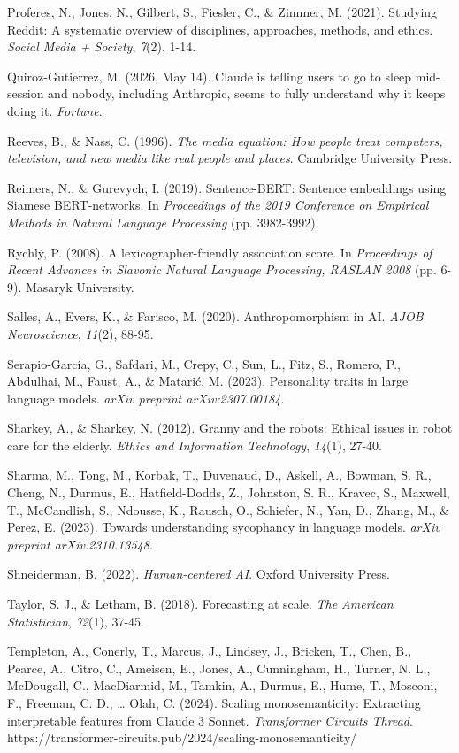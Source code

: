\documentclass[11pt]{article}
\begin{document}
Proferes, N., Jones, N., Gilbert, S., Fiesler, C., \& Zimmer, M. (2021). Studying Reddit: A systematic overview of disciplines, approaches, methods, and ethics. \emph{Social Media + Society}, \emph{7}(2), 1-14.

Quiroz-Gutierrez, M. (2026, May 14). Claude is telling users to go to sleep mid-session and nobody, including Anthropic, seems to fully understand why it keeps doing it. \emph{Fortune}.

Reeves, B., \& Nass, C. (1996). \emph{The media equation: How people treat computers, television, and new media like real people and places}. Cambridge University Press.

Reimers, N., \& Gurevych, I. (2019). Sentence-BERT: Sentence embeddings using Siamese BERT-networks. In \emph{Proceedings of the 2019 Conference on Empirical Methods in Natural Language Processing} (pp. 3982-3992).

Rychlý, P. (2008). A lexicographer-friendly association score. In \emph{Proceedings of Recent Advances in Slavonic Natural Language Processing, RASLAN 2008} (pp. 6-9). Masaryk University.

Salles, A., Evers, K., \& Farisco, M. (2020). Anthropomorphism in AI. \emph{AJOB Neuroscience}, \emph{11}(2), 88-95.

Serapio-García, G., Safdari, M., Crepy, C., Sun, L., Fitz, S., Romero, P., Abdulhai, M., Faust, A., \& Matarić, M. (2023). Personality traits in large language models. \emph{arXiv preprint arXiv:2307.00184}.

Sharkey, A., \& Sharkey, N. (2012). Granny and the robots: Ethical issues in robot care for the elderly. \emph{Ethics and Information Technology}, \emph{14}(1), 27-40.

Sharma, M., Tong, M., Korbak, T., Duvenaud, D., Askell, A., Bowman, S. R., Cheng, N., Durmus, E., Hatfield-Dodds, Z., Johnston, S. R., Kravec, S., Maxwell, T., McCandlish, S., Ndousse, K., Rausch, O., Schiefer, N., Yan, D., Zhang, M., \& Perez, E. (2023). Towards understanding sycophancy in language models. \emph{arXiv preprint arXiv:2310.13548}.

Shneiderman, B. (2022). \emph{Human-centered AI}. Oxford University Press.

Taylor, S. J., \& Letham, B. (2018). Forecasting at scale. \emph{The American Statistician}, \emph{72}(1), 37-45.

Templeton, A., Conerly, T., Marcus, J., Lindsey, J., Bricken, T., Chen, B., Pearce, A., Citro, C., Ameisen, E., Jones, A., Cunningham, H., Turner, N. L., McDougall, C., MacDiarmid, M., Tamkin, A., Durmus, E., Hume, T., Mosconi, F., Freeman, C. D., \ldots{} Olah, C. (2024). Scaling monosemanticity: Extracting interpretable features from Claude 3 Sonnet. \emph{Transformer Circuits Thread}. https://transformer-circuits.pub/2024/scaling-monosemanticity/
\end{document}
